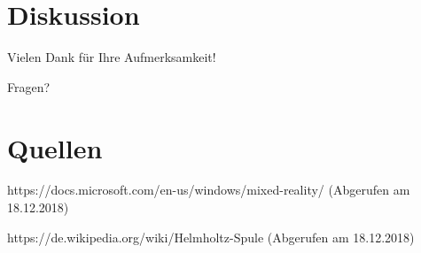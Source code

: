 \part{Diskussion}
\begin{frame}[fragile]{}
Vielen Dank für Ihre Aufmerksamkeit!

\vspace{1em}
\hspace{1em} Fragen?
\end{frame}

\part{Quellen}
\begin{frame}[allowframebreaks]
\printbibliography
\end{frame}

\begin{frame}
https://docs.microsoft.com/en-us/windows/mixed-reality/ (Abgerufen am 18.12.2018)

https://de.wikipedia.org/wiki/Helmholtz-Spule (Abgerufen am 18.12.2018)
\end{frame}


